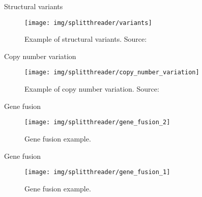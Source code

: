 \documentclass[10pt]{beamer}
\newcommand{\1}{
        	\setbeamertemplate{background}{
        		\texttt{[image: img/1\_BIO]}
        		\tikz[overlay] \fill[fill opacity=0.75,fill=white] (0,0) rectangle (-\paperwidth,\paperheight);
        	}
}
\begin{document}
\begin{frame}{Structural variants}{}
	\begin{figure}[h]
		\centering
		\texttt{[image: img/splitthreader/variants]}
		\caption{Example of structural variants. Source: \cite{sv_pacbio_2021}}
		\label{fig:variants}
	\end{figure}	
\end{frame}

\begin{frame}{Copy number variation}{}
	\begin{figure}[h]
		\centering
		\texttt{[image: img/splitthreader/copy\_number\_variation]}
		\caption{Example of copy number variation. Source: \cite{cnv_nih_2021}}
		\label{fig:cnv}
	\end{figure}	
\end{frame}


\begin{frame}{Gene fusion}{}
	\begin{figure}[h]
		\centering
		\texttt{[image: img/splitthreader/gene\_fusion\_2]}
		\caption{Gene fusion example.}
		\label{fig:cnv}
	\end{figure}	
\end{frame}


\begin{frame}{Gene fusion}{}
	\begin{figure}[h]
		\centering
		\texttt{[image: img/splitthreader/gene\_fusion\_1]}
		\caption{Gene fusion example.}
		\label{fig:cnv}
	\end{figure}	
\end{frame}
\end{document}
